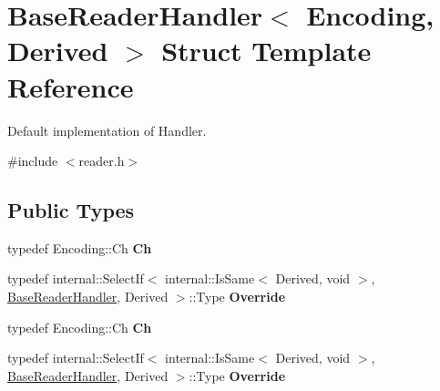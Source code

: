 \hypertarget{struct_base_reader_handler}{}\section{Base\+Reader\+Handler$<$ Encoding, Derived $>$ Struct Template Reference}
\label{struct_base_reader_handler}


Default implementation of Handler.  




{\ttfamily \#include $<$reader.\+h$>$}

\subsection*{Public Types}
\begin{DoxyCompactItemize}
\item 
typedef Encoding\+::\+Ch {\bfseries Ch}\hypertarget{struct_base_reader_handler_a8302c755dd3560c8c5bac99162c28214}{}\label{struct_base_reader_handler_a8302c755dd3560c8c5bac99162c28214}

\item 
typedef internal\+::\+Select\+If$<$ internal\+::\+Is\+Same$<$ Derived, void $>$, \hyperlink{struct_base_reader_handler}{Base\+Reader\+Handler}, Derived $>$\+::Type {\bfseries Override}\hypertarget{struct_base_reader_handler_a7b6c70d9bf7483b2de5d249f1593776a}{}\label{struct_base_reader_handler_a7b6c70d9bf7483b2de5d249f1593776a}

\item 
typedef Encoding\+::\+Ch {\bfseries Ch}\hypertarget{struct_base_reader_handler_a8302c755dd3560c8c5bac99162c28214}{}\label{struct_base_reader_handler_a8302c755dd3560c8c5bac99162c28214}

\item 
typedef internal\+::\+Select\+If$<$ internal\+::\+Is\+Same$<$ Derived, void $>$, \hyperlink{struct_base_reader_handler}{Base\+Reader\+Handler}, Derived $>$\+::Type {\bfseries Override}\hypertarget{struct_base_reader_handler_a7b6c70d9bf7483b2de5d249f1593776a}{}\label{struct_base_reader_handler_a7b6c70d9bf7483b2de5d249f1593776a}

\end{DoxyCompactItemize}
